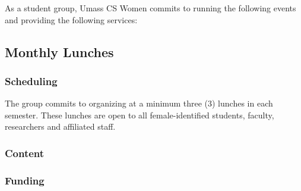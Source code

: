 As a student group, Umass CS Women commits to running the following events and providing the following services:
\subsection{Monthly Lunches}
\label{sec:lunches}

\subsubsection{Scheduling}
\label{sec:lunches_scheduling}
The group commits to organizing at a minimum three (3) lunches in each semester. These lunches are open to all female-identified students, faculty, researchers and affiliated staff.

\subsubsection{Content}
\label{sec:lunches_content}

\subsubsection{Funding}
\label{sec:lunches_funding}
